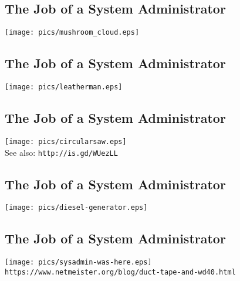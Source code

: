 \documentclass[xga]{xdvislides}
\begin{document}
\subsection{The Job of a System Administrator}
\vspace*{\fill}
\begin{center}
	\texttt{[image: pics/mushroom\_cloud.eps]} \\
\end{center}
\vspace*{\fill}

\subsection{The Job of a System Administrator}
\vspace*{\fill}
\begin{center}
	\texttt{[image: pics/leatherman.eps]} \\
\end{center}
\vspace*{\fill}

\subsection{The Job of a System Administrator}
\vspace*{\fill}
\begin{center}
	\texttt{[image: pics/circularsaw.eps]} \\
	\small See also: {\tt http://is.gd/WUezLL} \Normalsize
\end{center}
\vspace*{\fill}

\subsection{The Job of a System Administrator}
\vspace*{\fill}
\begin{center}
	\texttt{[image: pics/diesel-generator.eps]} \\
\end{center}
\vspace*{\fill}

\subsection{The Job of a System Administrator}
\vspace*{\fill}
\begin{center}
	\texttt{[image: pics/sysadmin-was-here.eps]} \\
	\vspace{.25in}
	\small
	\verb+https://www.netmeister.org/blog/duct-tape-and-wd40.html+
	\Normalsize
\end{center}
\vspace*{\fill}
\end{document}
